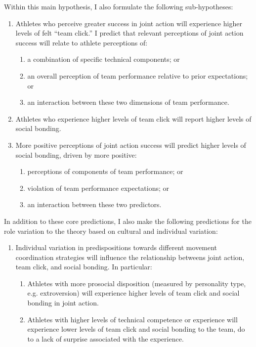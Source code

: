\begin{CJK}{UTF8}{gbsn}
    Within this main hypothesis, I also formulate the following sub-hypotheses:
    \begin{enumerate}
      \item Athletes who perceive greater success in joint action will experience higher levels of felt ``team click.'' I predict that relevant perceptions of joint action success will relate to athlete perceptions of:
        \begin{enumerate}
          \item a combination of specific technical components; or
          \item an overall perception of team performance relative to prior expectations; or
          \item an interaction between these two dimensions of team performance.
        \end{enumerate}
      \item Athletes who experience higher levels of team click will report higher levels of social bonding.
      \item More positive perceptions of joint action success will predict higher levels of social bonding, driven by more positive:
      \begin{enumerate}
        \item perceptions of components of team performance; or
        \item violation of team performance expectations; or
        \item an interaction between these two predictors.
      \end{enumerate}
    \end{enumerate}

In addition to these core predictions, I also make the following predictions for the role variation to the theory based on cultural and individual variation:

\begin{enumerate}
  \item Individual variation in predispositions towards different movement coordination strategies will influence the relationship betweens joint action, team click, and social bonding.  In particular:
      \begin{enumerate}
        \item Athletes with more prosocial disposition (measured by personality type, e.g. extroversion) will experience higher levels of team click and social bonding in joint action.
        \item Athletes with higher levels of technical competence or experience will experience lower levels of team click and social bonding to the team, do to a lack of surprise associated with the experience.
      \end{enumerate}


\end{enumerate}
\end{CJK}
